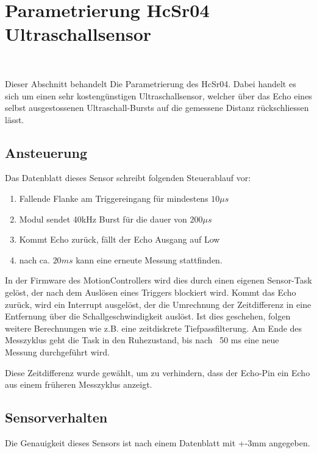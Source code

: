 \documentclass[main.tex]{subfiles} %
\begin{document}

\section{Parametrierung HcSr04 Ultraschallsensor}~\label{apdx:FilterDimensionierungHcSr04}

Dieser Abschnitt behandelt Die Parametrierung des HcSr04. Dabei handelt es sich
um einen sehr kostengünstigen Ultraschallsensor, welcher über das Echo eines
selbst ausgestossenen Ultraschall-Bursts auf die gemessene Distanz
rückschliessen lässt.

\subsection*{Ansteuerung}

Das Datenblatt dieses Sensor schreibt folgenden Steuerablauf vor:

\begin{enumerate}
    \item Fallende Flanke am Triggereingang für mindestens $10 \mu s$
    \item Modul sendet 40kHz Burst für die dauer von $200 \mu s$
    \item Kommt Echo zurück, fällt der Echo Ausgang auf Low
    \item nach ca. $20 ms$ kann eine erneute Messung stattfinden.
\end{enumerate}

In der Firmware des MotionControllers wird dies durch einen eigenen Sensor-Task
gelöst, der nach dem Auslösen eines Triggers blockiert wird. Kommt das Echo
zurück, wird ein Interrupt ausgelöst, der die Umrechnung der Zeitdifferenz in
eine Entfernung über die Schallgeschwindigkeit auslöst. Ist dies geschehen,
folgen weitere Berechnungen wie z.B. eine zeitdiskrete Tiefpassfilterung. Am
Ende des Messzyklus geht die Task in den Ruhezustand, bis nach ~50 ms eine neue
Messung durchgeführt wird.

Diese Zeitdifferenz wurde gewählt, um zu verhindern, dass der Echo-Pin ein Echo
aus einem früheren Messzyklus anzeigt.

\subsection*{Sensorverhalten}
Die Genauigkeit dieses Sensors ist nach einem Datenblatt mit +-3mm angegeben.
\end{document}
